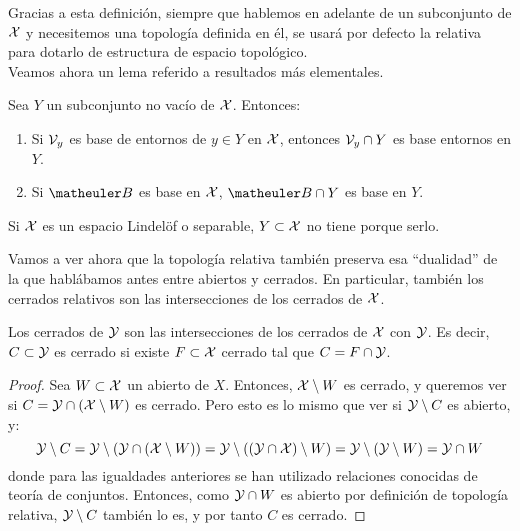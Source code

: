 	Gracias a esta definición, siempre que hablemos en adelante de un subconjunto de $\mathcal{X}$ y necesitemos una topología definida en él, se usará por defecto la relativa para dotarlo de estructura de espacio topológico. \\

Veamos ahora un lema referido a resultados más elementales.

\begin{lem}
	Sea $Y$ un subconjunto no vacío de $\mathcal{X}$. Entonces:
	\begin{enumerate} 
		\item Si $\mathcal{V}_y$ es base de entornos de $y \in Y$ en $\mathcal{X}$, entonces $\mathcal{V}_y \cap Y$ es base entornos en $Y$.
		\item Si $\B$ es base en $\mathcal{X}$, $\B \cap Y$ es base en $Y$. 	
	\end{enumerate}
\end{lem}

\begin{obs}
	Si $\mathcal{X}$ es un espacio Lindelöf o separable, $Y \subset \mathcal{X}$ no tiene porque serlo. \qedhere
\end{obs}

Vamos a ver ahora que la topología relativa también preserva esa ``dualidad'' de la que hablábamos antes entre abiertos y cerrados. En particular, también los cerrados relativos son las intersecciones de los cerrados de $\mathcal{X}$.

\begin{lem}
	Los cerrados de $\mathcal{Y}$ son las intersecciones de los cerrados de $\mathcal{X}$ con $\mathcal{Y}$. Es decir, $C\subset\mathcal{Y}$ es cerrado si existe $F\subset\mathcal{X}$ cerrado tal que $C = F\cap\mathcal{Y}$.
	
	\begin{proof}
		Sea $W\subset\mathcal{X}$ un abierto de $X$. Entonces, $\mathcal{X}\setminus W$ es cerrado, y queremos ver si $C=\mathcal{Y}\cap(\mathcal{X}\setminus W)$ es cerrado. Pero esto es lo mismo que ver si $\mathcal{Y}\setminus C$ es abierto, y:
		\[\mathcal{Y}\setminus C=\mathcal{Y}\setminus (\mathcal{Y}\cap(\mathcal{X}\setminus W))=\mathcal{Y}\setminus ((\mathcal{Y}\cap\mathcal{X})\setminus W)=\mathcal{Y}\setminus (\mathcal{Y}\setminus W) = \mathcal{Y}\cap W\]
		donde para las igualdades anteriores se han utilizado relaciones conocidas de teoría de conjuntos. Entonces, como $\mathcal{Y}\cap W$ es abierto por definición de topología relativa, $\mathcal{Y}\setminus C$ también lo es, y por tanto $C$ es cerrado.
	\end{proof}
\end{lem}

